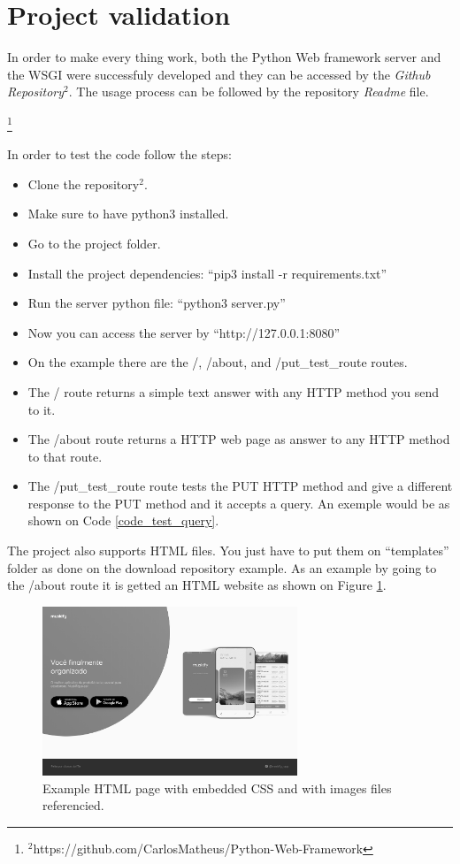 \documentclass[journal,12pt,onecolumn,draftclsnofoot,]{IEEEtran}
\newcommand\blfootnote[1]{%
  \begingroup
  \renewcommand\thefootnote{}\footnote{#1}%
  \addtocounter{footnote}{-1}%
  \endgroup
}
\let\i\textit
\begin{document}
\section{Project validation}
In order to make every thing work, both the Python Web framework server and the WSGI were successfuly developed and they can be accessed by the \i{Github Repository}$^2$. The usage process can be followed by the repository \i{Readme} file.

\blfootnote{$^2$https://github.com/CarlosMatheus/Python-Web-Framework}

In order to test the code follow the steps:
\begin{itemize}
    \item Clone the repository$^2$.
    \item Make sure to have python3 installed.
    \item Go to the project folder.
    \item Install the project dependencies: ``pip3 install -r requirements.txt''
    \item Run the server python file: ``python3 server.py''
    \item Now you can access the server by ``http://127.0.0.1:8080''
    \item On the example there are the /, /about, and /put\_test\_route routes.
    \item The / route returns a simple text answer with any HTTP method you send to it.
    \item The /about route returns a HTTP web page as answer to any HTTP method to that route.
    \item The /put\_test\_route route tests the PUT HTTP method and give a different response to the PUT method and it accepts a query. An exemple would be as shown on Code \ref{code_test_query}.
\end{itemize}

The project also supports HTML files. You just have to put them on ``templates'' folder as done on the download repository example. As an example by going to the /about route it is getted an HTML website as shown on Figure \ref{fig_site}.

\begin{figure}
  \begin{center}
  \includegraphics[width=3.0in]{./imgs/example_page.png}
  \caption{Example HTML page with embedded CSS and with images files referencied.}
  \label{fig_site}
  \end{center}
\end{figure}
\end{document}
